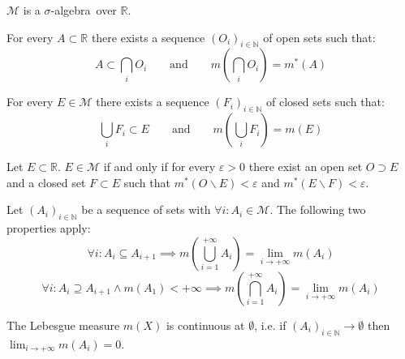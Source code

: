         \begin{property}
			$\mathcal{M}$ is a $\sigma$-algebra\footnotemark\ over $\mathbb{R}$. 
		\end{property}
        
        \begin{theorem}
			For every $A\subset\mathbb{R}$ there exists a sequence $(O_i)_{i\in\mathbb{N}}$ of open sets such that:
            \begin{equation}
            	\label{lebesgue:theorem:open_cover_existence}
				A\subset\bigcap_iO_i\qquad\text{and}\qquad m\left(\bigcap_iO_i\right) = m^*(A)
			\end{equation}
		\end{theorem}
        \begin{theorem}
			For every $E\in\mathcal{M}$ there exists a sequence $(F_i)_{i\in\mathbb{N}}$ of closed sets such that:
            \begin{equation}
            	\label{lebesgue:theorem:closed_cover_existence}
				\bigcup_iF_i\subset E\qquad\text{and}\qquad m\left(\bigcup_iF_i\right) = m(E)
			\end{equation}
		\end{theorem}
        
        \begin{theorem}
			Let $E\subset\mathbb{R}$. $E\in\mathcal{M}$ if and only if for every $\varepsilon>0$ there exist an open set $O\supset E$ and a closed set $F\subset E$ such that $m^*(O\backslash E) < \varepsilon$ and $m^*(E\backslash F)<\varepsilon$.
		\end{theorem}
        
        \begin{property}
			Let $(A_i)_{i\in\mathbb{N}}$ be a sequence of sets with $\forall i:A_i\in\mathcal{M}$. The following two properties apply:
            \begin{equation}
            	\forall i: A_i\subseteq A_{i+1} \implies m\left(\bigcup_{i=1}^{+\infty}A_i\right) = \lim_{i\rightarrow+\infty}m(A_i)
			\end{equation}
            \begin{equation}
            	\forall i: A_i\supseteq A_{i+1} \land m(A_1)<+\infty\implies m\left(\bigcap_{i=1}^{+\infty}A_i\right) = \lim_{i\rightarrow+\infty}m(A_i)
			\end{equation}
		\end{property}
        \begin{property}
			The Lebesgue measure $m(X)$ is continuous at $\emptyset$, i.e. if $(A_i)_{i\in\mathbb{N}}\rightarrow\emptyset$ then $\displaystyle\lim_{i\rightarrow+\infty}m(A_i) = 0$.
		\end{property}
        
